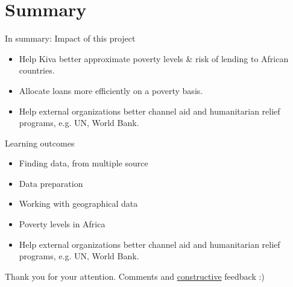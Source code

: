 \documentclass[10pt]{beamer}
\begin{document}
\section{Summary}
\begin{frame}{In summary: Impact of this project}
\begin{itemize}
    \item Help Kiva better approximate poverty levels & risk of lending to African countries.
    \item Allocate loans more efficiently on a poverty basis.
     
     \item Help external organizations better channel aid and humanitarian relief programs, e.g. UN, World Bank.
\end{itemize}
\end{frame}



\begin{frame}{Learning outcomes}
\begin{itemize}
    \item Finding data, from multiple source
    \item Data preparation 
    \item Working with geographical data
    \item Poverty levels in Africa
     
     \item Help external organizations better channel aid and humanitarian relief programs, e.g. UN, World Bank.
\end{itemize}
\end{frame}



\begin{frame}

\vspace{1.5cm}
\begin{center}
Thank you for your attention. Comments and \underline {constructive} feedback :)
\end{center}

\end{frame}
\end{document}

